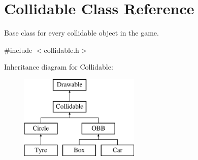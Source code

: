 \hypertarget{class_collidable}{}\section{Collidable Class Reference}
\label{class_collidable}


Base class for every collidable object in the game.  




{\ttfamily \#include $<$collidable.\+h$>$}

Inheritance diagram for Collidable\+:\begin{figure}[H]
\begin{center}
\leavevmode
\includegraphics[height=4.000000cm]{class_collidable}
\end{center}
\end{figure}
